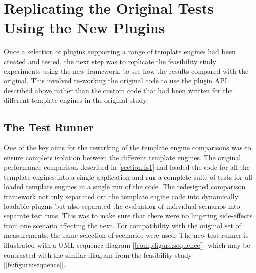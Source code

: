 \section{Replicating the Original Tests Using the New Plugins}
\label{section:comp:test replication}

Once a selection of plugins supporting a range of \gls{template engine}s had been created and tested, the next step was to replicate the feasibility study experiments using the new framework, to see how the results compared with the original. This involved re-working the original code to use the plugin API described above rather than the custom code that had been written for the different \gls{template engine}s in the original study.

\subsection{The Test Runner}
\label{section:comp:test runner}

One of the key aims for the reworking of the \gls{template engine} comparisons was to ensure complete isolation between the different \gls{template engine}s. The original performance comparison described in \autoref{section:fs1} had loaded the code for all the \gls{template engine}s into a single application and run a complete suite of tests for all loaded \gls{template engine}s in a single run of the code. The redesigned comparison framework not only separated out the \gls{template engine} code into dynamically loadable plugins but also separated the evaluation of individual scenarios into separate test runs. This was to make sure that there were no lingering side-effects from one scenario affecting the next. For compatibility with the original set of measurements, the same selection of scenarios were used. The new test runner is illustrated with a UML sequence diagram [\autoref{comp:figure:sequence}], which may be contrasted with the similar diagram from the feasibility study [\autoref{fs:figure:sequence}].

